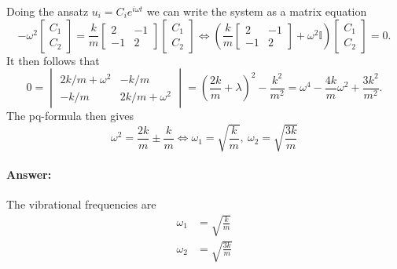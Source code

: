 Doing the ansatz $u_i = C_i e^{i\omega t}$ we can write the system as a matrix equation
\begin{equation*}
    -\omega^2 \begin{bmatrix}
        C_1\\
        C_2
    \end{bmatrix}
    = \frac{k}{m}
    \begin{bmatrix}
        2 & -1\\
        -1 & 2
    \end{bmatrix}
    \begin{bmatrix}
        C_1\\
        C_2
    \end{bmatrix}
    \iff
    \left( 
    \frac{k}{m}
    \begin{bmatrix}
        2 & -1\\
        -1 & 2
    \end{bmatrix}
    +
    \omega^2
    \mathbb{I}
    \right) 
    \begin{bmatrix}
        C_1\\
        C_2
    \end{bmatrix} = 0.
\end{equation*} 
It then follows that 
\begin{equation*}
    0 =
    \begin{vmatrix}
    2k/m + \omega^2 & -k/m\\
    -k/m & 2k/m + \omega^2
    \end{vmatrix}
    = \left(\frac{2k}{m} + \lambda\right)^2 - \frac{k^2}{m^2} = \omega^4 -\frac{4k}{m} \omega^2 + \frac{3k^2}{m^2}.
\end{equation*}
The pq-formula then gives 
\begin{equation*}
    \omega^2 = \frac{2k}{m} \pm \frac{k}{m} \iff \omega_1 = \sqrt{\frac{k}{m}},\: \omega_2 = \sqrt{\frac{3k}{m}}
\end{equation*}

\paragraph{Answer:} The vibrational frequencies are 
\begin{align*}
    \omega_1 &= \sqrt{\frac{k}{m}}\\[8pt]
    \omega_2 &= \sqrt{\frac{3k}{m}}
\end{align*}